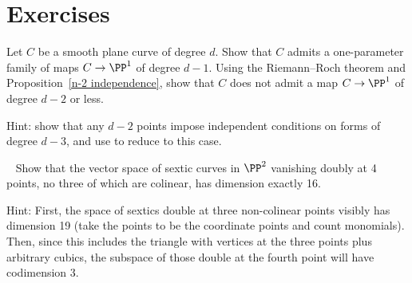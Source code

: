\section{Exercises}

\begin{exercise}\label{gonality of smooth plane curve}
Let $C$ be a smooth plane curve of degree $d$. Show that $C$ admits a
one-parameter family of maps $C \to \PP^1$ of degree $d-1$. Using the
%
Riemann--Roch theorem and Proposition~\ref{n-2 independence}, show
that $C$ does not admit a map $C \to \PP^1$ of degree $d-2$ or less.  

Hint: show that any $d-2$ points impose independent conditions on
forms of degree $d-3$, and use 
to reduce to this case.
\end{exercise}

\begin{exercise}~\label{double vanishing at 4 points}
Show that the vector space of sextic curves in $\PP^2$ vanishing doubly at 4 points, no three of which are colinear,  has dimension
exactly 16.

Hint: First, the space of sextics double at three non-colinear points visibly has dimension 19 (take the points to be the coordinate points and count monomials). Then, since this includes the triangle with vertices at the three points plus arbitrary cubics, the subspace of those double at the fourth point will have codimension 3.
\end{exercise}


